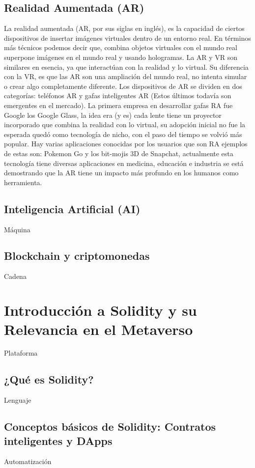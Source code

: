 \documentclass[a4paper,10pt]{article}
\begin{document}
	\subsection{Realidad Aumentada (AR)}
	La realidad aumentada (AR, por sus siglas en inglés), es la capacidad de ciertos dispositivos de insertar imágenes virtuales dentro de un entorno real. En términos más técnicos podemos decir que, combina objetos virtuales con el mundo real superpone imágenes en el mundo real y usando hologramas. La AR y VR son similares en esencia, ya que interactúan con la realidad y lo virtual. Su diferencia con la VR, es que las AR son una ampliación del mundo real, no intenta simular o crear algo completamente diferente. Los dispositivos de AR se dividen en dos categorías: teléfonos AR y gafas inteligentes AR (Estos últimos todavía son emergentes en el mercado). La primera empresa en desarrollar gafas RA fue Google los Google Glass, la idea era (y es) cada lente tiene un proyector incorporado que combina la realidad con lo virtual, su adopción inicial no fue la esperada quedó como tecnología de nicho, con el paso del tiempo se volvió más popular. Hay varias aplicaciones conocidas por los usuarios que son RA ejemplos de estas son: Pokemon Go y los bit-mojis 3D de Snapchat, actualmente esta tecnología tiene diversas aplicaciones en medicina, educación e industria se está demostrando que la AR tiene un impacto más profundo en los humanos como herramienta.
	
	\subsection{Inteligencia Artificial (AI)}
	Máquina
	\subsection{Blockchain y criptomonedas}
	Cadena
	
	\section{Introducción a Solidity y su Relevancia en el Metaverso}
	Plataforma
	\subsection{¿Qué es Solidity?}
	Lenguaje
	\subsection{Conceptos básicos de Solidity: Contratos inteligentes y DApps}
	Automatización
\end{document}
